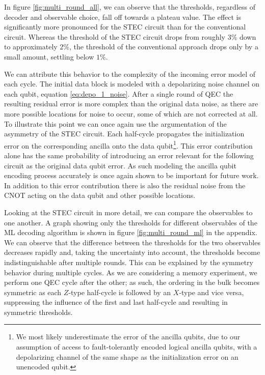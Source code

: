 In figure \ref{fig:multi_round_all}, we can observe that the thresholds, regardless of decoder and observable choice, fall off towards a plateau value. 
The effect is significantly more pronounced for the STEC circuit than for the conventional circuit. 
Whereas the threshold of the STEC circuit drops from roughly $3\%$ down to approximately $2\%$, the threshold of the conventional approach drops only by a small amount, settling below $1\%$.

We can attribute this behavior to the complexity of the incoming error model of each cycle.
The initial data block is modeled with a depolarizing noise channel on each qubit, equation \eqref{eq:depo_1_noise}.
After a single round of QEC the resulting residual error is more complex than the original data noise, 
as there are more possible locations for noise to occur, some of which are not corrected at all.
To illustrate this point we can once again use the argumentation of the asymmetry of the STEC circuit.
Each half-cycle propagates the initialization error on the corresponding ancilla onto the data qubit\footnote{
    We most likely underestimate the error of the ancilla qubits, due to our assumption of access to fault-tolerantly encoded logical ancilla qubits, 
    with a depolarizing channel of the same shape as the initialization error on an unencoded qubit.
}. 
This error contribution alone has the same probability of introducing an error relevant for the following circuit as the original data qubit error.
As such modeling the ancilla qubit encoding process accurately is once again shown to be important for future work.  
In addition to this error contribution there is also the residual noise from the CNOT acting on the data qubit and other possible locations. 

Looking at the STEC circuit in more detail, we can compare the observables to one another.
A graph showing only the thresholds for different observables of the ML decoding algorithm is shown in figure \ref{fig:multi_round_ml} in the appendix.
We can observe that the difference between the thresholds for the two observables decreases rapidly and, taking the uncertainty into account, the thresholds become indistinguishable after multiple rounds.
This can be explained by the symmetry behavior during multiple cycles. 
As we are considering a memory experiment, we perform one QEC cycle after the other; 
as such, the ordering in the bulk becomes symmetric as each $Z$-type half-cycle is followed by an $X$-type and vice versa,
suppressing the influence of the first and last half-cycle and resulting in symmetric thresholds.

